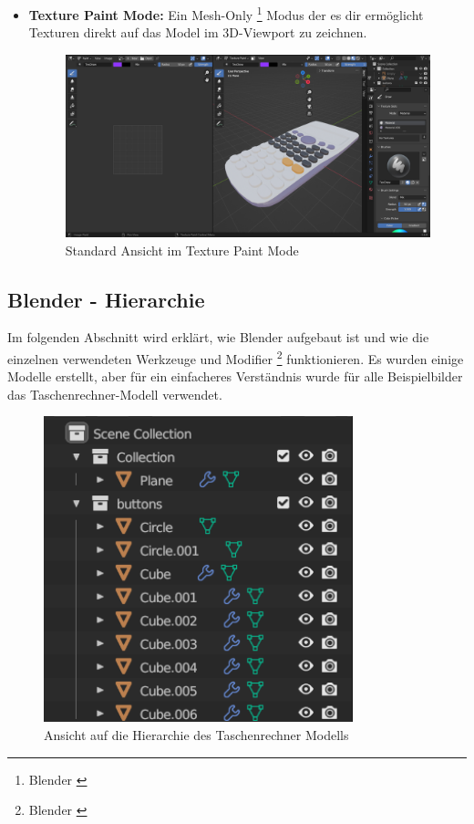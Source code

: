 \begin{itemize}
\item \textbf{Texture Paint Mode:} Ein Mesh-Only \footnote{Blender \cite{Mesh}} Modus der es dir ermöglicht Texturen direkt auf das Model im 3D-Viewport
zu zeichnen.
\begin{figure}[H]
\centering
\includegraphics[width=1\textwidth]{images/texturepaintmode.png}
\caption{Standard Ansicht im Texture Paint Mode}
\label{fig:texturepaintmode}
\end{figure}
\end{itemize}

\subsection{Blender - Hierarchie}
Im folgenden Abschnitt wird erklärt, wie Blender aufgebaut ist und wie die einzelnen verwendeten Werkzeuge und Modifier
\footnote{Blender \cite{Modifier}} funktionieren. Es wurden einige Modelle erstellt, aber für ein einfacheres Verständnis
wurde für alle Beispielbilder das Taschenrechner-Modell verwendet.
\begin{figure}[H]
\centering
\includegraphics[width=0.8\textwidth]{images/blenderhierarchy.png}
\caption{Ansicht auf die Hierarchie des Taschenrechner Modells}
\label{fig:blenderhierarchy}
\end{figure}


